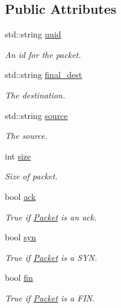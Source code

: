 \subsection*{\-Public \-Attributes}
\begin{DoxyCompactItemize}
\item 
std\-::string \hyperlink{classPacket_acaefdb9f910265a1ff97b522a780f088}{uuid}
\begin{DoxyCompactList}\small\item\em \-An id for the packet. \end{DoxyCompactList}\item 
std\-::string \hyperlink{classPacket_a14d18bd9829ec1951730bc8bbadb570d}{final\-\_\-dest}
\begin{DoxyCompactList}\small\item\em \-The destination. \end{DoxyCompactList}\item 
std\-::string \hyperlink{classPacket_a9fdc30310ed4a548f4a51dc6c79442d9}{source}
\begin{DoxyCompactList}\small\item\em \-The source. \end{DoxyCompactList}\item 
int \hyperlink{classPacket_ad6c10fc808850949cd3f9b9a2ff018d5}{size}
\begin{DoxyCompactList}\small\item\em \-Size of packet. \end{DoxyCompactList}\item 
bool \hyperlink{classPacket_a1824b08ed28de1f329146d082b6d0dee}{ack}
\begin{DoxyCompactList}\small\item\em \-True if \hyperlink{classPacket}{\-Packet} is an ack. \end{DoxyCompactList}\item 
bool \hyperlink{classPacket_ad27cb1ca949aa1dece5a14d0cc734a8e}{syn}
\begin{DoxyCompactList}\small\item\em \-True if \hyperlink{classPacket}{\-Packet} is a \-S\-Y\-N. \end{DoxyCompactList}\item 
bool \hyperlink{classPacket_a2143fa46561ca6d5f5edd8678602ef6c}{fin}
\begin{DoxyCompactList}\small\item\em \-True if \hyperlink{classPacket}{\-Packet} is a \-F\-I\-N. \end{DoxyCompactList}\item 

\end{DoxyCompactItemize}
